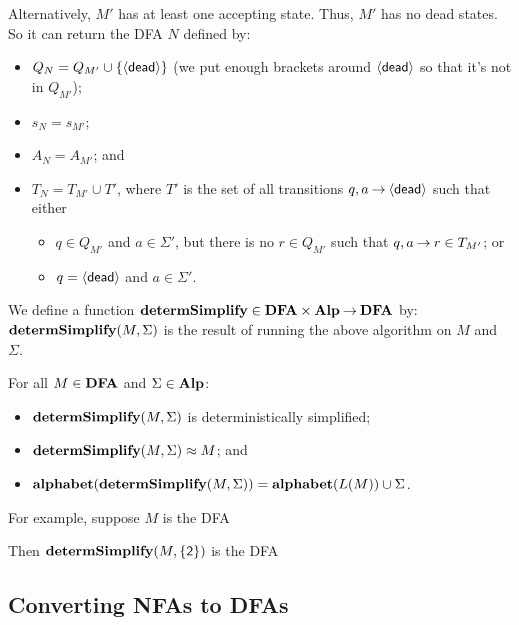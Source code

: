 Alternatively, $M'$ has at least one accepting state.  Thus, $M'$ has
no dead states.  So it can return the DFA $N$ defined by:
\begin{itemize}
\item $Q_N = Q_{M'}\cup\{\langle\mathsf{dead}\rangle\}$ (we put enough brackets around
$\langle\mathsf{dead}\rangle$ so that it's not in $Q_{M'}$);

\item $s_N=s_{M'}$;

\item $A_N=A_{M'}$; and

\item $T_N=T_{M'}\cup T'$, where $T'$ is the set of all transitions
  $q,a\mathbin{\to}\langle\mathsf{dead}\rangle$ such that either
\begin{itemize}
\item $q\in Q_{M'}$ and $a\in\Sigma'$, but there is no $r\in Q_{M'}$
  such that $q,a\mathbin{\to} r\in T_{M'}$; or

\item $q=\langle\mathsf{dead}\rangle$ and $a\in\Sigma'$.
\end{itemize}
\end{itemize}

We define a function $\mathbf{determSimplify}\in\mathbf{DFA}\times\mathbf{Alp}\mathbin{\to}\mathbf{DFA}$
by: $\mathbf{determSimplify}(M,\Sigma)$ is the result of
running the above algorithm on $M$ and $\Sigma$.

\begin{theorem}
For all $M\in\mathbf{DFA}$ and $\Sigma\in\mathbf{Alp}$:
\begin{itemize}
\item $\mathbf{determSimplify}(M,\Sigma)$ is deterministically simplified;

\item $\mathbf{determSimplify}(M,\Sigma)\approx M$; and

\item $\mathbf{alphabet}(\mathbf{determSimplify}(M,\Sigma)) = \mathbf{alphabet}(L(M))\cup\Sigma$.
\end{itemize}
\end{theorem}

For example, suppose $M$ is the DFA
\begin{center}

\end{center}
Then $\mathbf{determSimplify}(M,\{\mathsf{2}\})$ is the DFA
\begin{center}

\end{center}

\subsection{Converting NFAs to DFAs}

